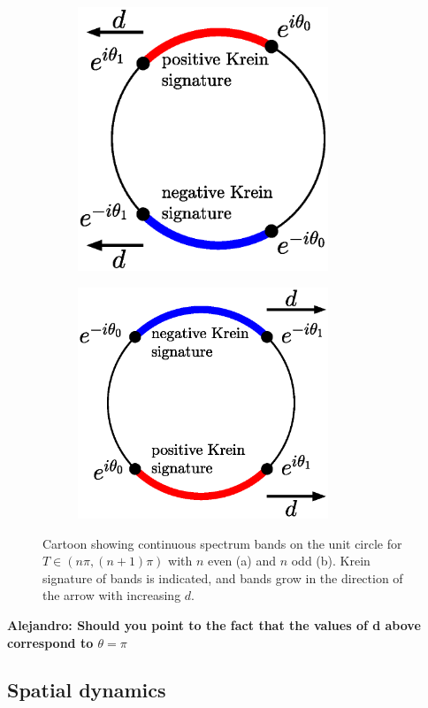 \documentclass[12pt,reqno]{amsart}
\theoremstyle{definition}
\begin{document}
\begin{figure}
	\begin{center}
	\begin{subfigure}{0.45\linewidth}
		\caption{}
		\includegraphics[width=7.5cm]{contspeccartoon1.eps}
	\end{subfigure}
	\begin{subfigure}{0.45\linewidth}
		\caption{}
		\includegraphics[width=7.5cm]{contspeccartoon2.eps}
	\end{subfigure}
	\end{center}
	\caption{Cartoon showing continuous spectrum bands on the unit circle for $T \in (n \pi, (n+1)\pi)$ with $n$ even (a) and $n$ odd (b). Krein signature of bands is indicated, and bands grow in the direction of the arrow with increasing $d$.}
	\label{fig:bands}
\end{figure}

{\bf Alejandro: Should you point to the fact that the values of d above correspond to $\theta = \pi$}

\subsection{Spatial dynamics}
\end{document}

